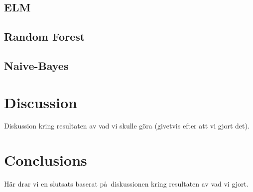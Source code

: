 \documentclass{article}
\begin{document}
\subsection{ELM}

\subsection{Random Forest}

\subsection{Naive-Bayes}

\section{Discussion}
Diskussion kring resultaten av vad vi skulle g\"ora (givetvis efter att vi gjort det).
\section{Conclusions}
H\"ar drar vi en slutsats baserat p\aa\ diskussionen kring resultaten av vad vi gjort.
\end{document}
